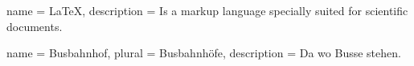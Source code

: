 %
\makeglossaries

{
    name = LaTeX,
    description = {
        Is a markup language specially suited for scientific documents.%
    }
}

{
    name = Busbahnhof,
    plural = Busbahnhöfe,
    description = {Da wo Busse stehen.}
}

\glsclearpage
